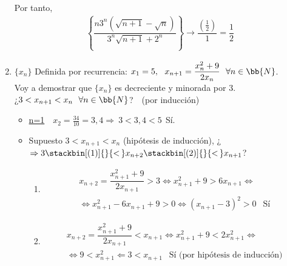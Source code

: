 \documentclass[12pt]{article}
\begin{document}
\begin{ejercicio}[4 puntos]
\begin{enumerate}
            Por tanto,
            \begin{gather*}
                \left\{ \dfrac{n 3^n (\sqrt{n+1}-\sqrt{n})}{3^n \sqrt{n+1}+2^n} \right\} \longrightarrow \dfrac{\left(\frac{1}{2}\right)}{1} = \dfrac{1}{2}
            \end{gather*}
            
            \item $\{x_n\}$ Definida por recurrencia: $x_1=5,\ \ x_{n+1}=\dfrac{x_n^2 + 9}{2x_n}\ \ \forall n \in \bb{N}$.\\

            Voy a demostrar que $\{x_n\}$ es decreciente y minorada por 3.\\
            
            ¿$3<x_{n+1}<x_n \ \ \forall n \in \bb{N}$?\ \ (por inducción)
            \begin{itemize}[label=$\ast$]
                \item \underline{n=1}\ \ $x_2=\frac{34}{10}=3,4\Longrightarrow \ 3<3,4<5\ \ $Sí.
                \item Supuesto $3<x_{n+1}<x_n$ (hipótesis de inducción), ¿$\Rightarrow 3 \stackbin[(1)]{}{<\,} x_{n+2} \stackbin[(2)]{}{<\,}x_{n+1}$?

                \begin{enumerate}[label=(\arabic*)]
                    \item \begin{gather*}
                        x_{n+2}=\dfrac{x_{n+1}^2 + 9}{2x_{n+1}}> 3 \Longleftrightarrow x_{n+1}^2 + 9 > 6x_{n+1} \Longleftrightarrow \\
                        \Longleftrightarrow x_{n+1}^2 -6x_{n+1} + 9 > 0 \Longleftrightarrow (x_{n+1}-3)^2 > 0\ \ \text{ Sí}
                    \end{gather*}

                    \item \begin{gather*}
                        x_{n+2}=\dfrac{x_{n+1}^2 + 9}{2x_{n+1}}< x_{n+1} \Longleftrightarrow x_{n+1}^2 + 9 < 2x_{n+1}^2 \Longleftrightarrow\\
                        \Longleftrightarrow 9 < x_{n+1}^2 \Longleftarrow 3 < x_{n+1}\ \ \text{ Sí (por hipótesis de inducción)}
                    \end{gather*}
                \end{enumerate}
            \end{itemize}


\end{enumerate}
\end{ejercicio}
\end{document}
